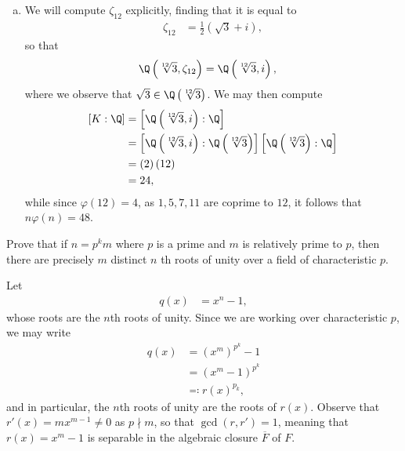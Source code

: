 \documentclass[10pt]{mypackage}
\begin{document}
\begin{solution}
\begin{enumerate}[(a)]
\begin{align*}
\begin{cases}
        \end{cases}
          \intertext{whence}
          \theta\left( \varphi_1\circ\varphi_2 \right) &= \left( d_1k_1 + d_1d_2k_2,d_1d_2 \right).
      \end{align*}
      This is injective since we can only have $\left( dk,d \right)\mapsto \left( 0,1 \right)$ when $d = 1$ and $k = 0$, so that $\ker\left( \theta \right) = \id$.
    \item We will compute $\zeta_{12}$ explicitly, finding that it is equal to
      \begin{align*}
        \zeta_{12} &= \frac{1}{2} \left( \sqrt{3} + i \right),
      \end{align*}
      so that
      \begin{align*}
        \Q\left( \sqrt[12]{3},\zeta_{12} \right) &= \Q\left( \sqrt[12]{3},i \right),
      \end{align*}
      where we observe that $\sqrt{3}\in \Q\left( \sqrt[12]{3} \right)$. We may then compute
      \begin{align*}
        \left[ K:\Q \right] &= \left[ \Q\left( \sqrt[12]{3},i \right):\Q \right]\\
                            &= \left[ \Q\left( \sqrt[12]{3},i \right):\Q\left( \sqrt[12]{3} \right) \right]\left[ \Q\left( \sqrt[12]{3} \right):\Q \right]\\
                            &= \left( 2 \right)\left( 12 \right)\\
                            &= 24,
      \end{align*}
      while since $\varphi\left( 12 \right) = 4$, as $1,5,7,11$ are coprime to $12$, it follows that $n\varphi(n) = 48$.
  \end{enumerate}
\end{solution}
\begin{problem}[Problem 6]
  Prove that if $n = p^{k}m$ where $p$ is a prime and $m$ is relatively prime to $p$, then there are precisely $m$ distinct $n$ th roots of unity over a field of characteristic $p$.
\end{problem}
\begin{solution}
  Let
  \begin{align*}
    q(x) &= x^{n}-1,
  \end{align*}
  whose roots are the $n$th roots of unity. Since we are working over characteristic $p$, we may write
  \begin{align*}
    q(x) &= \left( x^{m} \right)^{p^k}-1\\
         &= \left( x^{m}-1 \right)^{p^{k}}\\
         &\eqqcolon r(x)^{p_k},
  \end{align*}
  and in particular, the $n$th roots of unity are the roots of $r(x)$. Observe that $r'(x) = mx^{m-1}\neq 0$ as $p\nmid m$, so that $\gcd\left( r,r' \right) = 1$, meaning that $r(x) = x^{m}-1$ is separable in the algebraic closure $ \overline{F} $ of $F$.
\end{solution}
\end{document}
